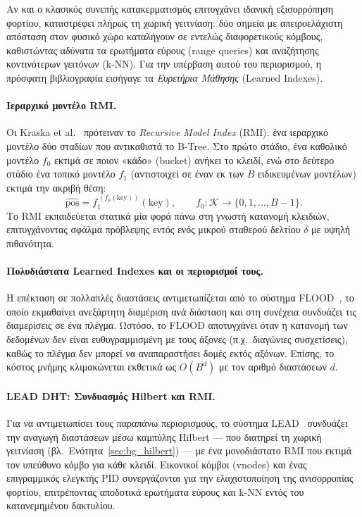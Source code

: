 Αν και ο κλασικός συνεπής κατακερματισμός επιτυγχάνει ιδανική εξισορρόπηση φορτίου, καταστρέφει πλήρως τη χωρική γειτνίαση: δύο σημεία με απειροελάχιστη απόσταση στον φυσικό χώρο καταλήγουν σε εντελώς διαφορετικούς κόμβους, καθιστώντας αδύνατα τα ερωτήματα εύρους (range queries) και αναζήτησης κοντινότερων γειτόνων (k-NN). Για την υπέρβαση αυτού του περιορισμού, η πρόσφατη βιβλιογραφία εισήγαγε τα \textit{Ευρετήρια Μάθησης} (Learned Indexes).

\paragraph{Ιεραρχικό μοντέλο RMI.}
Οι Kraska et al.~\cite{kraska2018case} πρότειναν το \textit{Recursive Model Index} (RMI): ένα ιεραρχικό μοντέλο δύο σταδίων που αντικαθιστά το B-Tree. Στο πρώτο στάδιο, ένα καθολικό μοντέλο $f_0$ εκτιμά σε ποιον «κάδο» (bucket) ανήκει το κλειδί, ενώ στο δεύτερο στάδιο ένα τοπικό μοντέλο $f_1$ (αντιστοιχεί σε έναν εκ των $B$ ειδικευμένων μοντέλων) εκτιμά την ακριβή θέση:
\begin{equation}
    \hat{\text{pos}} = f_1^{\,(f_0(\text{key}))}\!(\text{key}),
    \qquad f_0 : \mathcal{K} \to \{0, 1, \ldots, B-1\}.
\end{equation}
Το RMI εκπαιδεύεται στατικά μία φορά πάνω στη γνωστή κατανομή κλειδιών, επιτυγχάνοντας σφάλμα πρόβλεψης εντός ενός μικρού σταθερού δελτίου $\delta$ με υψηλή πιθανότητα.

\paragraph{Πολυδιάστατα Learned Indexes και οι περιορισμοί τους.}
Η επέκταση σε πολλαπλές διαστάσεις αντιμετωπίζεται από το σύστημα FLOOD~\cite{nathan2020flood}, το οποίο εκμαθαίνει ανεξάρτητη διαμέριση ανά διάσταση και στη συνέχεια συνδυάζει τις διαμερίσεις σε ένα πλέγμα. Ωστόσο, το FLOOD αποτυγχάνει όταν η κατανομή των δεδομένων δεν είναι ευθυγραμμισμένη με τους άξονες (π.χ.\ διαγώνιες συσχετίσεις), καθώς το πλέγμα δεν μπορεί να αναπαραστήσει δομές εκτός αξόνων. Επίσης, το κόστος μνήμης κλιμακώνεται εκθετικά ως $O(B^d)$ με τον αριθμό διαστάσεων $d$.

\paragraph{LEAD DHT: Συνδυασμός Hilbert και RMI.}
Για να αντιμετωπίσει τους παραπάνω περιορισμούς, το σύστημα LEAD~\cite{wang2025lead} συνδυάζει την αναγωγή διαστάσεων μέσω καμπύλης Hilbert --- που διατηρεί τη χωρική γειτνίαση (βλ.\ Ενότητα~\ref{sec:bg_hilbert}) --- με ένα μονοδιάστατο RMI που εκτιμά τον υπεύθυνο κόμβο για κάθε κλειδί. Εικονικοί κόμβοι (vnodes) και ένας επιγραμμικός ελεγκτής PID συνεργάζονται για την ελαχιστοποίηση της ανισορροπίας φορτίου, επιτρέποντας αποδοτικά ερωτήματα εύρους και k-NN εντός του κατανεμημένου δακτυλίου.
